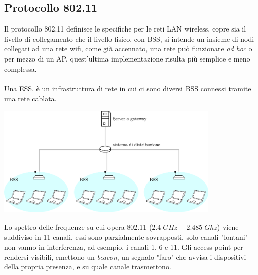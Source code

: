 \documentclass[12pt, letterpaper]{article}
\newcommand{\acc}{\\\hphantom{}\\}
\begin{document}
\subsection{Protocollo 802.11}
Il protocollo 802.11 definisce le specifiche per le reti LAN wireless, copre sia il livello di collegamento che 
il livello fisico, con BSS, si intende un insieme di nodi collegati ad una rete wifi, come già accennato, una rete 
può funzionare \textit{ad hoc} o per mezzo di un AP, quest'ultima implementazione risulta più semplice e meno complessa.\acc 
Una ESS, è un infrastruttura di rete in cui ci sono diversi BSS connessi tramite una rete cablata.\begin{center}
    \includegraphics[width=0.8\textwidth ]{images/ESS.eps}
\end{center}
Lo spettro delle frequenze su cui opera 802.11 ($2.4\;GHz-2.485\;Ghz$) viene suddiviso in 11 canali, essi sono 
parzialmente sovrapposti, solo canali "lontani" non vanno in interferenza, ad esempio, i canali 1, 6 e 11. Gli access 
point per rendersi visibili, emettono un \textit{beacon}, un segnalo "faro" che avvisa i dispositivi della propria 
presenza, e su quale canale trasmettono.
\end{document}
